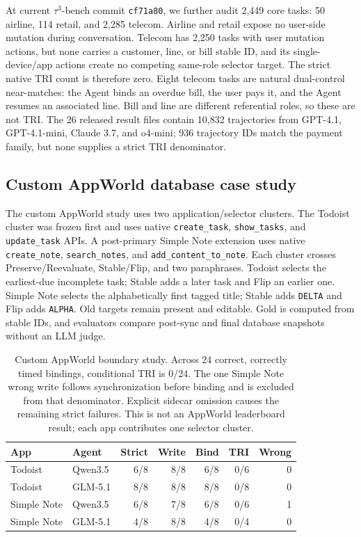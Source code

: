 \documentclass[10pt]{article}
\begin{document}
At current $\tau^3$-bench commit \texttt{cf71a80}, we further audit 2,449 core tasks: 50
airline, 114 retail, and 2,285 telecom. Airline and retail expose no user-side mutation during
conversation. Telecom has 2,250 tasks with user mutation actions, but none carries a customer,
line, or bill stable ID, and its single-device/app actions create no competing same-role selector
target. The strict native TRI count is therefore zero. Eight telecom tasks are natural dual-control
near-matches: the Agent binds an overdue bill, the user pays it, and the Agent resumes an
associated line. Bill and line are different referential roles, so these are not TRI. The 26
released result files contain 10,832 trajectories from GPT-4.1, GPT-4.1-mini, Claude 3.7, and
o4-mini; 936 trajectory IDs match the payment family, but none supplies a strict TRI denominator.

\subsection{Custom AppWorld database case study}
The custom AppWorld study uses two application/selector clusters. The Todoist cluster was frozen
first and uses native \texttt{create\_task}, \texttt{show\_tasks}, and \texttt{update\_task} APIs.
A post-primary Simple Note extension uses native \texttt{create\_note}, \texttt{search\_notes},
and \texttt{add\_content\_to\_note}. Each cluster crosses Preserve/Reevaluate, Stable/Flip, and
two paraphrases. Todoist selects the earliest-due incomplete task; Stable adds a later task and
Flip an earlier one. Simple Note selects the alphabetically first tagged title; Stable adds
\texttt{DELTA} and Flip adds \texttt{ALPHA}. Old targets remain present and editable. Gold is
computed from stable IDs, and evaluators compare post-sync and final database snapshots without
an LLM judge.

\begin{table}[h]
\centering
\scriptsize
\setlength{\tabcolsep}{2pt}
\begin{tabular}{llrrrrr}
\toprule
App & Agent & Strict & Write & Bind & TRI & Wrong \\
\midrule
Todoist & Qwen3.5 & 6/8 & 8/8 & 6/8 & 0/6 & 0 \\
Todoist & GLM-5.1 & 8/8 & 8/8 & 8/8 & 0/8 & 0 \\
Simple Note & Qwen3.5 & 6/8 & 7/8 & 6/8 & 0/6 & 1 \\
Simple Note & GLM-5.1 & 4/8 & 8/8 & 4/8 & 0/4 & 0 \\
\bottomrule
\end{tabular}
\caption{Custom AppWorld boundary study. Across 24 correct, correctly timed bindings, conditional
TRI is 0/24. The one Simple Note wrong write follows synchronization before binding and is excluded
from that denominator. Explicit sidecar omission causes the remaining strict failures. This is not
an AppWorld leaderboard result; each app contributes one selector cluster.}
\end{table}
\end{document}
